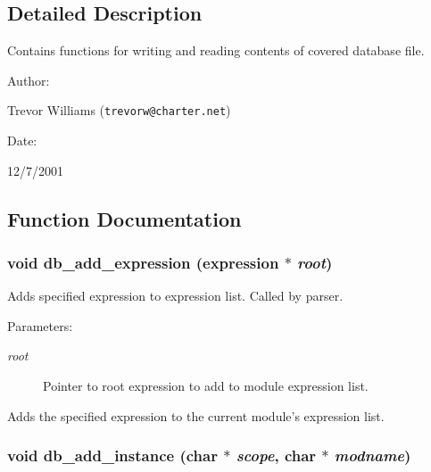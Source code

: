 \subsection{Detailed Description}
Contains functions for writing and reading contents of covered database file.



\begin{Desc}
\item[Author: ]\par
Trevor Williams ({\tt trevorw@charter.net}) \end{Desc}
\begin{Desc}
\item[Date: ]\par
12/7/2001\end{Desc}


\subsection{Function Documentation}
\subsubsection{\setlength{\rightskip}{0pt plus 5cm}void db\_\-add\_\-expression ({\bf expression} $\ast$ {\em root})}\label{db_8h_a7}


Adds specified expression to expression list. Called by parser.

\begin{Desc}
\item[Parameters: ]\par
\begin{description}
\item[{\em 
root}]Pointer to root expression to add to module expression list.\end{description}
\end{Desc}
Adds the specified expression to the current module's expression list. 
\subsubsection{\setlength{\rightskip}{0pt plus 5cm}void db\_\-add\_\-instance (char $\ast$ {\em scope}, char $\ast$ {\em modname})}\label{db_8h_a2}


